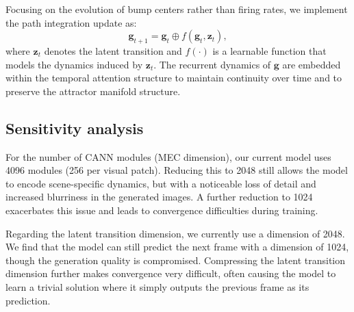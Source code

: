 Focusing on the evolution of bump centers rather than firing rates, we implement the path integration update as:
\begin{equation} \label{eq:path_integration}
\mathbf{g}_{t+1} = \mathbf{g}_t \oplus f(\mathbf{g}_t, \mathbf{z}_t),
\end{equation}
where $\mathbf{z}_t$ denotes the latent transition and $f(\cdot)$ is a learnable function that models the dynamics induced by $\mathbf{z}_t$. The recurrent dynamics of $\mathbf{g}$ are embedded within the temporal attention structure to maintain continuity over time and to preserve the attractor manifold structure.


\subsection{Sensitivity analysis}
For the number of CANN modules (MEC dimension), our current model uses 4096 modules (256 per visual patch). Reducing this to 2048 still allows the model to encode scene-specific dynamics, but with a noticeable loss of detail and increased blurriness in the generated images. A further reduction to 1024 exacerbates this issue and leads to convergence difficulties during training.

Regarding the latent transition dimension, we currently use a dimension of 2048. We find that the model can still predict the next frame with a dimension of 1024, though the generation quality is compromised. Compressing the latent transition dimension further makes convergence very difficult, often causing the model to learn a trivial solution where it simply outputs the previous frame as its prediction.

